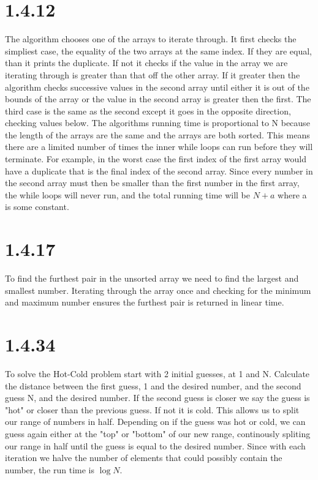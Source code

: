 \documentclass[12pt]{article}
\begin{document}
\section*{1.4.12}

The algorithm chooses one of the arrays to iterate through. It first checks the
simpliest case, the equality of the two arrays at the same index. If they are 
equal, than it prints the duplicate. If not it checks if the value in the 
array we are iterating through is greater than that off the other array. If it
greater then the algorithm checks successive values in the second array until 
either it is out of the bounds of the array or the value in the second array is
greater then the first. The third case is the same as the second except it goes
in the opposite direction, checking values below. The algorithms running time is
proportional to N because the length of the arrays are the same and the arrays 
are both sorted. This means there are a limited number of times the inner while
loops can run before they will terminate. For example, in the worst case the first
index of the first array would have a duplicate that is the final index of the
second array. Since every number in the second array must then be smaller than
the first number in the first array, the while loops will never run, and the 
total running time will be $N + a$ where a is some constant.



\noindent 



\section*{1.4.17}

To find the furthest pair in the unsorted array we need to find the largest and
smallest number. Iterating through the array once and checking for the minimum
and maximum number ensures the furthest pair is returned in linear time.

\noindent 

\section*{1.4.34}
To solve the Hot-Cold problem start with 2 initial guesses, at 1 and N. Calculate
the distance between the first guess, 1 and the desired number, and the second
guess N, and the desired number. If the second guess is closer we say the guess
is "hot" or closer than the previous guess. If not it is cold. This allows us 
to split our range of numbers in half. Depending on if the guess was hot or cold,
we can guess again either at the "top" or "bottom" of our new range, continously
spliting our range in half until the guess is equal to the desired number.
Since with each iteration we halve the number of elements that could possibly
contain the number, the run time is $\log N$.
\end{document}
